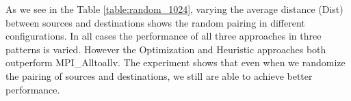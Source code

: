
As we see in the Table \ref{table:random_1024}, varying the average distance (Dist) between sources and destinations shows the random pairing in different configurations. In all cases the performance of all three approaches in three patterns is varied. However the Optimization and Heuristic approaches both outperform MPI\_Alltoallv. The experiment shows that even when we randomize the pairing of sources and destinations, we still are able to achieve better performance.
